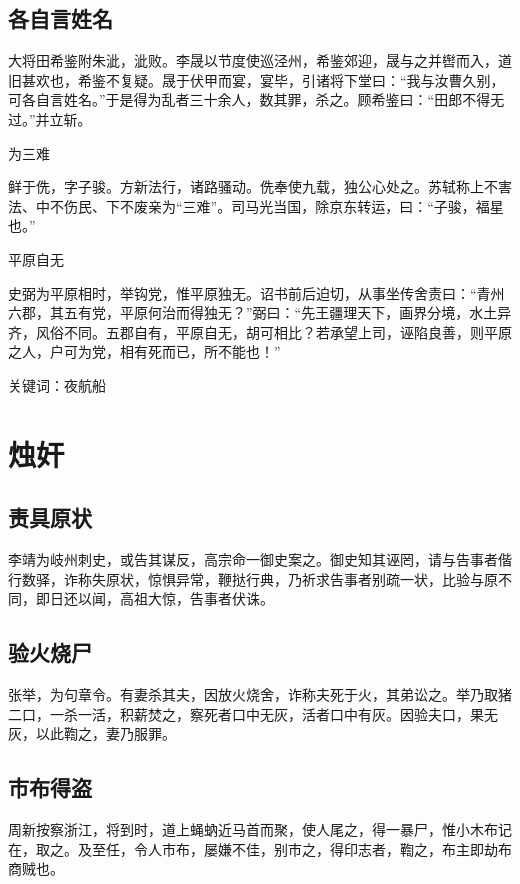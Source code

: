 \documentclass[a4paper,12pt,UTF8,twoside]{ctexbook}
\begin{document}
    \section{各自言姓名}
    
    大将田希鉴附朱泚，泚败。李晟以节度使巡泾州，希鉴郊迎，晟与之并辔而入，道旧甚欢也，希鉴不复疑。晟于伏甲而宴，宴毕，引诸将下堂曰：“我与汝曹久别，可各自言姓名。”于是得为乱者三十余人，数其罪，杀之。顾希鉴曰：“田郎不得无过。”并立斩。
    
    为三难
    
    鲜于侁，字子骏。方新法行，诸路骚动。侁奉使九载，独公心处之。苏轼称上不害法、中不伤民、下不废亲为“三难”。司马光当国，除京东转运，曰：“子骏，福星也。”
    
    平原自无
    
    史弼为平原相时，举钩党，惟平原独无。诏书前后迫切，从事坐传舍责曰：“青州六郡，其五有党，平原何治而得独无？”弼曰：“先王疆理天下，画界分境，水土异齐，风俗不同。五郡自有，平原自无，胡可相比？若承望上司，诬陷良善，则平原之人，户可为党，相有死而已，所不能也！”
    
    关键词：夜航船
    
    \chapter{烛奸}
    
    \section{责具原状}
    
    李靖为岐州刺史，或告其谋反，高宗命一御史案之。御史知其诬罔，请与告事者偕行数驿，诈称失原状，惊惧异常，鞭挞行典，乃祈求告事者别疏一状，比验与原不同，即日还以闻，高祖大惊，告事者伏诛。
    
    \section{验火烧尸}
    
    张举，为句章令。有妻杀其夫，因放火烧舍，诈称夫死于火，其弟讼之。举乃取猪二口，一杀一活，积薪焚之，察死者口中无灰，活者口中有灰。因验夫口，果无灰，以此鞫之，妻乃服罪。
    
    \section{市布得盗}
    
    周新按察浙江，将到时，道上蝇蚋近马首而聚，使人尾之，得一暴尸，惟小木布记在，取之。及至任，令人市布，屡嫌不佳，别市之，得印志者，鞫之，布主即劫布商贼也。
    
\end{document}
